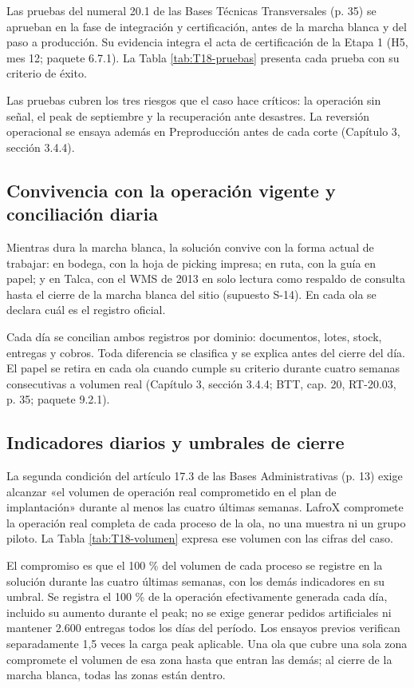 Las pruebas del numeral 20.1 de las Bases Técnicas Transversales (p. 35) se aprueban en la fase de integración y certificación, antes de la marcha blanca y del paso a producción. Su evidencia integra el acta de certificación de la Etapa 1 (H5, mes 12; paquete 6.7.1). La Tabla \ref{tab:T18-pruebas} presenta cada prueba con su criterio de éxito.


Las pruebas cubren los tres riesgos que el caso hace críticos: la operación sin señal, el peak de septiembre y la recuperación ante desastres. La reversión operacional se ensaya además en Preproducción antes de cada corte (Capítulo 3, sección 3.4.4).

\subsection{Convivencia con la operación vigente y conciliación diaria}

Mientras dura la marcha blanca, la solución convive con la forma actual de trabajar: en bodega, con la hoja de picking impresa; en ruta, con la guía en papel; y en Talca, con el WMS de 2013 en solo lectura como respaldo de consulta hasta el cierre de la marcha blanca del sitio (supuesto S-14). En cada ola se declara cuál es el registro oficial.

Cada día se concilian ambos registros por dominio: documentos, lotes, stock, entregas y cobros. Toda diferencia se clasifica y se explica antes del cierre del día. El papel se retira en cada ola cuando cumple su criterio durante cuatro semanas consecutivas a volumen real (Capítulo 3, sección 3.4.4; BTT, cap. 20, RT-20.03, p. 35; paquete 9.2.1).

\subsection{Indicadores diarios y umbrales de cierre}

La segunda condición del artículo 17.3 de las Bases Administrativas (p. 13) exige alcanzar «el volumen de operación real comprometido en el plan de implantación» durante al menos las cuatro últimas semanas. LafroX compromete la operación real completa de cada proceso de la ola, no una muestra ni un grupo piloto. La Tabla \ref{tab:T18-volumen} expresa ese volumen con las cifras del caso.


El compromiso es que el 100 \% del volumen de cada proceso se registre en la solución durante las cuatro últimas semanas, con los demás indicadores en su umbral. Se registra el 100 \% de la operación efectivamente generada cada día, incluido su aumento durante el peak; no se exige generar pedidos artificiales ni mantener 2.600 entregas todos los días del período. Los ensayos previos verifican separadamente 1,5 veces la carga peak aplicable. Una ola que cubre una sola zona compromete el volumen de esa zona hasta que entran las demás; al cierre de la marcha blanca, todas las zonas están dentro.

